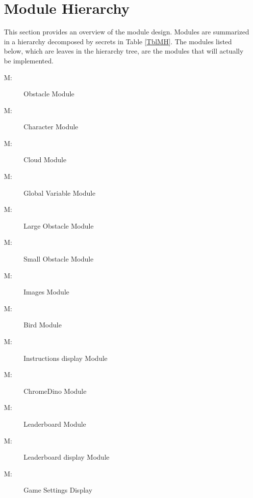 \documentclass[12pt, titlepage]{article}
\newcounter{mnum}
\newcommand{\mthemnum}{M\themnum}
\begin{document}
\section{Module Hierarchy} \label{SecMH}

This section provides an overview of the module design. Modules are summarized
in a hierarchy decomposed by secrets in Table \ref{TblMH}. The modules listed
below, which are leaves in the hierarchy tree, are the modules that will
actually be implemented.

\begin{description}
\item [ \mthemnum \label{mHH}:] Obstacle Module
\item [ \mthemnum \label{mHH}:] Character Module
\item [ \mthemnum \label{mHH}:] Cloud Module
\item [ \mthemnum \label{mHH}:] Global Variable Module
\item [ \mthemnum \label{mHH}:] Large Obstacle Module
\item [ \mthemnum \label{mHH}:] Small Obstacle Module
\item [ \mthemnum \label{mHH}:] Images Module
\item [ \mthemnum \label{mHH}:] Bird Module
\item [ \mthemnum \label{mHH}:] Instructions display Module
\item [ \mthemnum \label{mHH}:] ChromeDino Module
\item [ \mthemnum \label{mHH}:] Leaderboard Module
\item [ \mthemnum \label{mHH}:] Leaderboard display Module
\item [ \mthemnum \label{mHH}:] Game Settings Display

\end{description}

\end{document}

